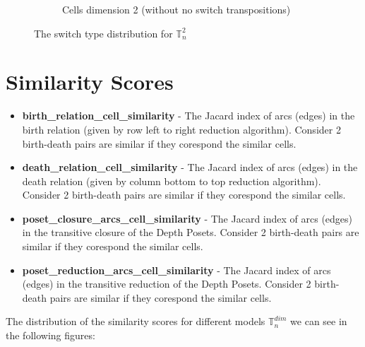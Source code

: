 \documentclass{article}
\begin{document}
\begin{figure}[htbp]
\begin{subfigure}[b]{0.3\textwidth}
    \caption{Cells dimension 2 (without no switch transpositions)}
    \label{fig:complex2cells2onlyswitch}
\end{subfigure}
\caption{The switch type distribution for $\mathbb{T}_n^{2}$}
\label{fig:typesdistribution2}
\end{figure}
\newpage

\section{Similarity Scores}

\begin{itemize}
\item \textbf{birth\_relation\_cell\_similarity} - The Jacard index of arcs (edges) in the birth relation (given by row left to right reduction algorithm).
    Consider 2 birth-death pairs are similar if they corespond the similar cells.
\item \textbf{death\_relation\_cell\_similarity} - The Jacard index of arcs (edges) in the death relation (given by column bottom to top reduction algorithm).
    Consider 2 birth-death pairs are similar if they corespond the similar cells.
\item \textbf{poset\_closure\_arcs\_cell\_similarity} - The Jacard index of arcs (edges) in the transitive closure of the Depth Posets.
    Consider 2 birth-death pairs are similar if they corespond the similar cells.
\item \textbf{poset\_reduction\_arcs\_cell\_similarity} - The Jacard index of arcs (edges) in the transitive reduction of the Depth Posets.
    Consider 2 birth-death pairs are similar if they corespond the similar cells.
\end{itemize}
\par The distribution of the similarity scores for different models $\mathbb{T}^{dim}_n$ we can see in the following figures:
\end{document}
